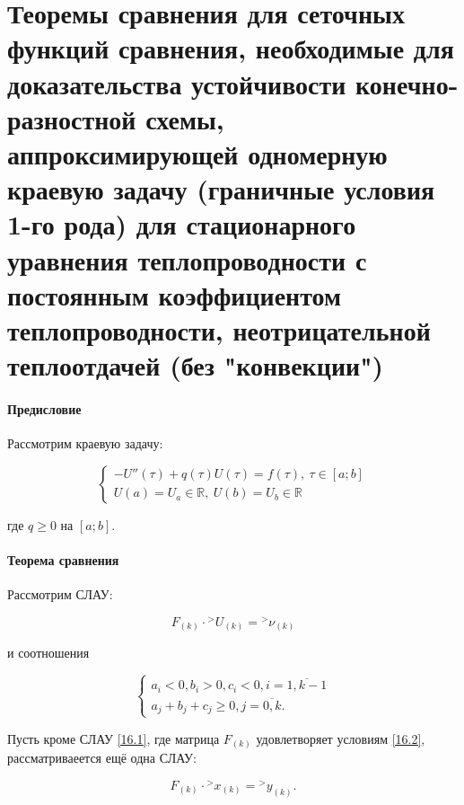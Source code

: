 \documentclass[__main__.tex]{subfiles}
\begin{document}
\section{Теоремы сравнения для сеточных функций сравнения, необходимые для доказательства устойчивости конечно-разностной схемы, аппроксимирующей одномерную краевую задачу (граничные условия 1-го рода) для стационарного уравнения теплопроводности с постоянным коэффициентом теплопроводности, неотрицательной теплоотдачей (без "конвекции")}

\paragraph{Предисловие}

Рассмотрим краевую задачу:

\begin{equation}
\begin{cases}
-U''\left(\tau\right)+q\left(\tau\right) U \left(\tau\right) = f\left( \tau \right), \ \tau \in [a;b] \\
U\left(a\right) = U_a \in \mathbb{R}, \ U\left(b\right) = U_b \in \mathbb{R}
\end{cases}
\end{equation}

где $q \geq 0$ на $[a;b]$.

\paragraph{Теорема сравнения}

Рассмотрим СЛАУ:

\begin{equation} \label{16.1}
F_{\left(k\right)} \cdot {}^> U_{\left(k\right)} = {}^> \nu_{\left(k\right)}
\end{equation}

и соотношения

\begin{equation} \label{16.2}
\begin{cases}
a_i < 0, b_i > 0, c_i < 0, i = \overline{1,k-1} \\
a_j+b_j+c_j \geq 0, j =\overline{0,k}.
\end{cases}
\end{equation}

Пусть кроме СЛАУ \ref{16.1}, где матрица $F_{\left(k\right)}$ удовлетворяет условиям \ref{16.2}, рассматриваеется ещё одна СЛАУ:

\begin{equation}\label{16.3}
F_{\left(k\right)} \cdot {}^> x_{\left(k\right)} = {}^> y_{\left(k\right)}.
\end{equation}
\end{document}
